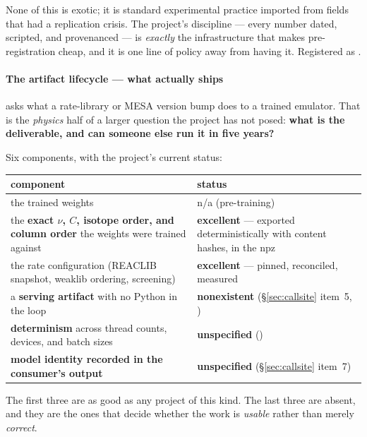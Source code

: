None of this is exotic; it is standard experimental practice imported from
fields that had a replication crisis. The project's  discipline
--- every number dated, scripted, and provenanced --- is \emph{exactly} the
infrastructure that makes pre-registration cheap, and it is one line of policy
away from having it. Registered as .

\paragraph{The artifact lifecycle --- what actually ships}
\label{sec:artifact}

 asks what a rate-library or MESA version bump does to a
trained emulator. That is the \emph{physics} half of a larger question the
project has not posed: \textbf{what is the deliverable, and can someone else run
it in five years?}

Six components, with the project's current status:

\begingroup
\small
\begin{tabularx}{\textwidth}{@{}Y L{6.4cm}@{}}
\toprule
\textbf{component} & \textbf{status} \\
\midrule
the trained weights & n/a (pre-training) \\
the \textbf{exact $\nu$, $C$, isotope order, and column order} the weights were
  trained against &
  \textbf{excellent} --- exported deterministically with content hashes,
   in the npz \\
the rate configuration (REACLIB snapshot, weaklib ordering, screening) &
  \textbf{excellent} --- pinned, reconciled, measured \\
a \textbf{serving artifact} with no Python in the loop &
  \textbf{nonexistent} (\S\ref{sec:callsite} item~5, ) \\
\textbf{determinism} across thread counts, devices, and batch sizes &
  \textbf{unspecified} () \\
\textbf{model identity recorded in the consumer's output} &
  \textbf{unspecified} (\S\ref{sec:callsite} item~7) \\
\bottomrule
\end{tabularx}
\endgroup

The first three are as good as any project of this kind. The last three are
absent, and they are the ones that decide whether the work is \emph{usable}
rather than merely \emph{correct}.

